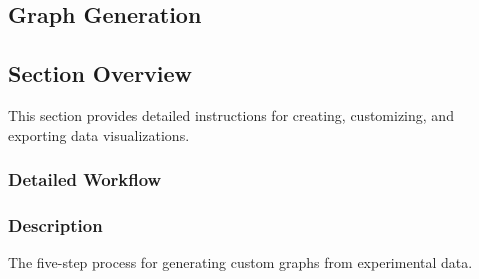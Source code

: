 \documentclass[12pt]{article}
\begin{document}
\subsection{Graph Generation}
\subsection*{Section Overview}
This section provides detailed instructions for creating, customizing, and
exporting data visualizations.

\subsubsection{Detailed Workflow}
\subsubsection*{Description}
The five-step process for generating custom graphs from experimental data.
\end{document}
